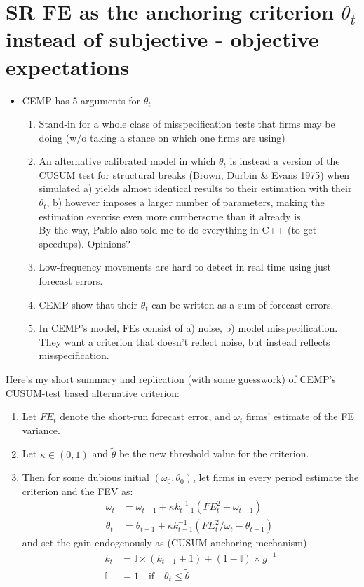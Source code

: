 \documentclass[11pt]{article}
\renewcommand{\[}{\begin{equation}}
\renewcommand{\]}{\end{equation}}
\begin{document}
\section{SR FE as the anchoring criterion $\theta_t$ instead of subjective - objective expectations}
	\begin{itemize}
	\item  CEMP has 5 arguments for $\theta_t$ 
		\begin{enumerate}
		\item Stand-in for a whole class of misspecification tests that firms may be doing (w/o taking a stance on which one firms are using)
		\item An alternative calibrated model in which $\theta_t$ is instead a version of the CUSUM test for structural breaks (Brown, Durbin \& Evans 1975) when simulated a) yields almost identical results to their estimation with their $\theta_t$, b) however imposes a larger number of parameters, making the estimation exercise even more cumbersome than it already is. \\
		By the way, Pablo also told me to do everything in C++ (to get speedups). Opinions?
		\item Low-frequency movements are hard to detect in real time using just forecast errors.
		\item CEMP show that their $\theta_t$ can be written as a sum of forecast errors.
		\item In CEMP's model, FEs consist of a) noise, b) model misspecification. They want a criterion that doesn't reflect noise, but instead reflects misspecification.
		\end{enumerate}
	\end{itemize}

Here's my short summary and replication (with some guesswork) of CEMP's CUSUM-test based alternative criterion:
\begin{enumerate}
\item Let $FE_t$ denote the short-run forecast error, and $\omega_t$ firms' estimate of the FE variance.
\item Let $\kappa \in (0,1)$ and $\tilde{\theta}$ be the new threshold value for the criterion.
\item Then for some dubious initial $(\omega_0, \theta_0)$, let firms in every period estimate the criterion and the FEV as:
\begin{align}
 \omega_t & =  \omega_{t-1} + \kappa k_{t-1}^{-1}(FE_t^2 -\omega_{t-1})\\
\theta_t & =  \theta_{t-1} + \kappa k_{t-1}^{-1}(FE_t^2/\omega_t -\theta_{t-1})\
\end{align}
and set the gain endogenously as (CUSUM anchoring mechanism)
\begin{align}
k_t & = \mathbb{I}\times(k_{t-1}+1) + (1-\mathbb{I}) \times \bar{g}^{-1} \\
\mathbb{I} & = 1 \quad \text{if} \quad  \theta_t \leq \tilde{\theta}
\end{align}
\end{enumerate}
\end{document}
